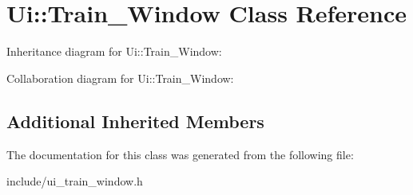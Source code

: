 \hypertarget{class_ui_1_1_train___window}{}\section{Ui\+:\+:Train\+\_\+\+Window Class Reference}
\label{class_ui_1_1_train___window}


Inheritance diagram for Ui\+:\+:Train\+\_\+\+Window\+:


Collaboration diagram for Ui\+:\+:Train\+\_\+\+Window\+:
\subsection*{Additional Inherited Members}


The documentation for this class was generated from the following file\+:\begin{DoxyCompactItemize}
\item 
include/ui\+\_\+train\+\_\+window.\+h\end{DoxyCompactItemize}
